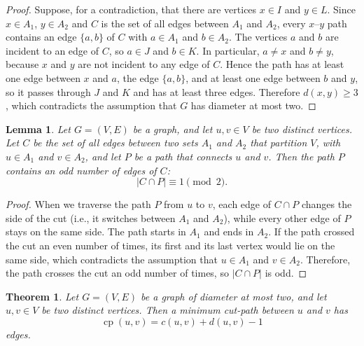 \documentclass[a4paper,fleqn]{cas-sc}
\numberwithin{equation}{section}
\theoremstyle{definition}
\theoremstyle{plain}
\newtheorem{theorem}[definition]{Theorem}
\newtheorem{lemma}[definition]{Lemma}
\theoremstyle{remark}
\newcommand{\cp}{\operatorname{cp}}                  %
\begin{document}
\begin{proof}
Suppose, for a contradiction, that there are vertices $x \in I$ and $y \in L$.
Since $x \in A_1$, $y \in A_2$ and $C$ is the set of all edges between $A_1$ and $A_2$, every $x$--$y$ path contains an edge $\{a, b\}$ of $C$ with $a \in A_1$ and $b \in A_2$.
The vertices $a$ and $b$ are incident to an edge of $C$, so $a \in J$ and $b \in K$.
In particular, $a \neq x$ and $b \neq y$, because $x$ and $y$ are not incident to any edge of $C$.
Hence the path has at least one edge between $x$ and $a$, the edge $\{a, b\}$, and at least one edge between $b$ and $y$, so it passes through $J$ and $K$ and has at least three edges.
Therefore $d(x, y) \geq 3$, which contradicts the assumption that $G$ has diameter at most two.
\end{proof}

\begin{lemma}
\label{lem:odd-intersection}
Let $G = (V, E)$ be a graph, and let $u, v \in V$ be two distinct vertices.
Let $C$ be the set of all edges between two sets $A_1$ and $A_2$ that partition $V$, with $u \in A_1$ and $v \in A_2$, and let $P$ be a path that connects $u$ and $v$.
Then the path $P$ contains an odd number of edges of $C$:
\[
|C \cap P| \equiv 1 \pmod{2}.
\]
\end{lemma}

\begin{proof}
When we traverse the path $P$ from $u$ to $v$, each edge of $C \cap P$ changes the side of the cut (i.e., it switches between $A_1$ and $A_2$), while every other edge of $P$ stays on the same side.
The path starts in $A_1$ and ends in $A_2$.
If the path crossed the cut an even number of times, its first and its last vertex would lie on the same side, which contradicts the assumption that $u \in A_1$ and $v \in A_2$.
Therefore, the path crosses the cut an odd number of times, so $|C \cap P|$ is odd.
\end{proof}

\begin{theorem}
\label{thm:diameter-two}
Let $G = (V, E)$ be a graph of diameter at most two, and let $u, v \in V$ be two distinct vertices.
Then a minimum cut-path between $u$ and $v$ has
\[
\cp(u, v) = c(u, v) + d(u, v) - 1
\]
edges.
\end{theorem}
\end{document}
